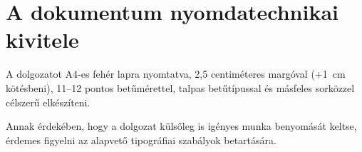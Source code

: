 \section{A dokumentum nyomdatechnikai kivitele}
A dolgozatot A4-es fehér lapra nyomtatva, 2,5 centiméteres margóval (+1~cm kötésbeni), 11--12 pontos betűmérettel, talpas betűtípussal és másfeles sorközzel célszerű elkészíteni.

Annak érdekében, hogy a dolgozat külsőleg is igényes munka benyomását keltse, érdemes figyelni az alapvető tipográfiai szabályok betartására.
